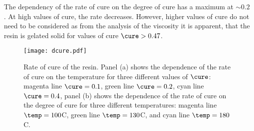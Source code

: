 \documentclass[twoside,a4paper,12pt]{article}
\begin{document}
The dependency of the rate of cure on the degree of cure has a maximum at $\sim 0.2$. At high values of cure, the rate decreases. However, higher values of cure do not need to be considered as from the analysis of the viscosity it is apparent, that the resin is gelated solid for values of cure $\cure > 0.47$.

\begin{figure}
  \centering
  \texttt{[image: dcure.pdf]}
  \caption{Rate of cure of the resin. Panel (a) shows the dependence of the
    rate of cure on the temperature for three different values of
    $\cure$: magenta line $\cure=0.1$, green line $\cure=0.2$, cyan
    line $\cure=0.4$, panel (b) shows the dependence of the rate of cure 
    on the degree of cure for three different temperatures: magenta
    line $\temp = 100$\degree C, green line $\temp = 130$\degree C, and cyan line
    $\temp = 180$\degree C.}
  \label{fig:cure}
\end{figure}
\end{document}
